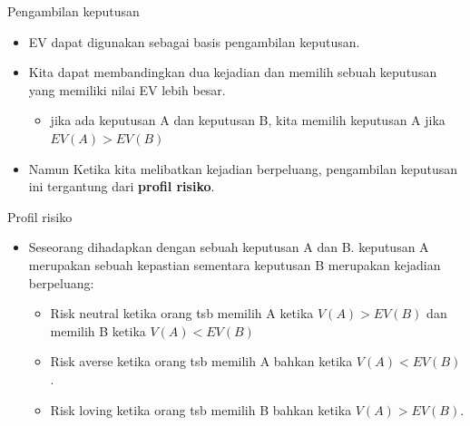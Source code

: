 \documentclass[
  ignorenonframetext,
]{beamer}
\providecommand{\tightlist}{%
  \setlength{\itemsep}{0pt}\setlength{\parskip}{0pt}}\usepackage{longtable,booktabs,array}
\begin{document}
\begin{frame}{Pengambilan keputusan}
\label{pengambilan-keputusan}
\begin{itemize}[<+->]
\item
  EV dapat digunakan sebagai basis pengambilan keputusan.
\item
  Kita dapat membandingkan dua kejadian dan memilih sebuah keputusan
  yang memiliki nilai EV lebih besar.

  \begin{itemize}[<+->]
  \tightlist
  \item
    jika ada keputusan A dan keputusan B, kita memilih keputusan A jika
    \(EV(A) > EV(B)\)
  \end{itemize}
\item
  Namun Ketika kita melibatkan kejadian berpeluang, pengambilan
  keputusan ini tergantung dari \textbf{profil risiko}.
\end{itemize}
\end{frame}

\begin{frame}{Profil risiko}
\label{profil-risiko}
\begin{itemize}
\item
  Seseorang dihadapkan dengan sebuah keputusan A dan B. keputusan A
  merupakan sebuah kepastian sementara keputusan B merupakan kejadian
  berpeluang:

  \begin{itemize}
  \item
    Risk neutral ketika orang tsb memilih A ketika \(V(A)>EV(B)\) dan
    memilih B ketika \(V(A)<EV(B)\)
  \item
    Risk averse ketika orang tsb memilih A bahkan ketika \(V(A)<EV(B)\).
  \item
    Risk loving ketika orang tsb memilih B bahkan ketika \(V(A)>EV(B)\).
  \end{itemize}
\end{itemize}
\end{frame}
\end{document}
